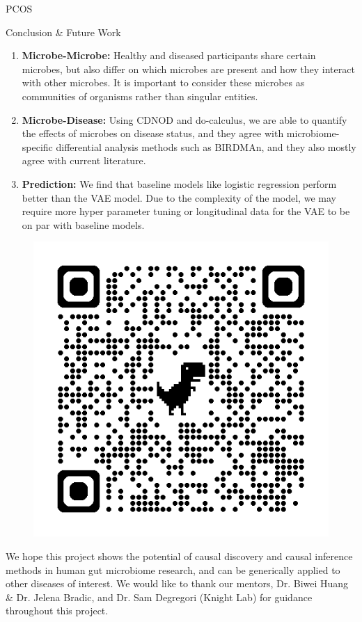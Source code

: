\documentclass[final]{beamer}
\newlength{\colwidth}
\begin{document}
\begin{frame}[t]
\begin{columns}[t]
\begin{column}{\colwidth}
\begin{block}{PCOS}
  \end{block}

  \begin{block}{Conclusion \& Future Work}
  
  \begin{enumerate}
      \item \textbf{Microbe-Microbe:} Healthy and diseased participants share certain microbes, but also differ on which microbes are present and how they interact with other microbes. It is important to consider these microbes as communities of organisms rather than singular entities.      
      \item \textbf{Microbe-Disease:} Using CDNOD and do-calculus, we are able to quantify the effects of microbes on disease status, and they agree with microbiome-specific differential analysis methods such as BIRDMAn, and they also mostly agree with current literature.
      \item \textbf{Prediction:} We find that baseline models like logistic regression perform better than the VAE model. Due to the complexity of the model, we may require more hyper parameter tuning or longitudinal data for the VAE to be on par with baseline models.
   \end{enumerate}
	
	\begin{figure}
           \centering
           \includegraphics[width=\linewidth]{website_qr.png}
    	\end{figure} We hope this project shows the potential of causal discovery and causal inference methods in human gut microbiome research, and can be generically applied to other diseases of interest. We would like to thank our mentors, Dr. Biwei Huang \& Dr. Jelena Bradic,  and Dr. Sam Degregori (Knight Lab) for guidance throughout this project.
    

\end{block}
\end{column}
\end{columns}
\end{frame}
\end{document}
